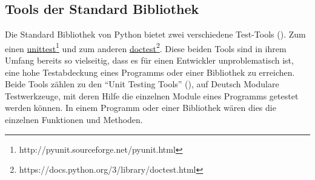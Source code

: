 \subsection{Tools der Standard Bibliothek}\label{python-tools:stdlib}

Die Standard Bibliothek von Python bietet zwei verschiedene Test-Tools (\cite{wiki.python:PythonTestingToolsTaxonomy}).
Zum einen
\href{http://pyunit.sourceforge.net/pyunit.html}{unittest}\footnote{http://pyunit.sourceforge.net/pyunit.html}
und zum anderen
\href{https://docs.python.org/3/library/doctest.html}{doctest}\footnote{https://docs.python.org/3/library/doctest.html}.
Diese beiden Tools sind in ihrem Umfang bereits so vielseitig, dass es für
einen Entwickler unproblematisch ist, eine hohe Testabdeckung eines Programms
oder einer Bibliothek zu erreichen.
\newline
\\
Beide Tools zählen zu den "`Unit Testing Tools"' 
(\cite{wiki.python:PythonTestingToolsTaxonomy}),
auf Deutsch Modulare Testwerkzeuge, mit deren Hilfe die einzelnen Module eines 
Programms getestet werden können. In einem Programm oder einer Bibliothek wären 
dies die einzelnen Funktionen und Methoden.



